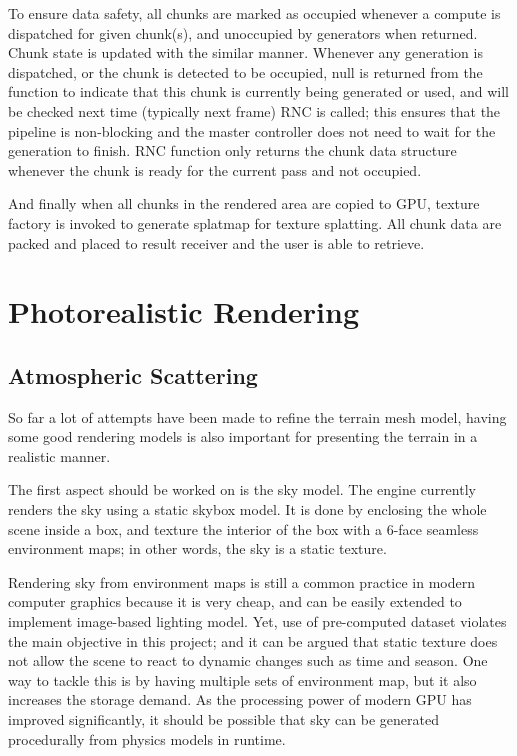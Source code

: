 \documentclass[oneside, a4paper]{report}
\begin{document}
    To ensure data safety, all chunks are marked as occupied whenever a compute is dispatched for given chunk(s), and unoccupied by generators when returned. Chunk state is updated with the similar manner. Whenever any generation is dispatched, or the chunk is detected to be occupied, null is returned from the function to indicate that this chunk is currently being generated or used, and will be checked next time (typically next frame) RNC is called; this ensures that the pipeline is non-blocking and the master controller does not need to wait for the generation to finish. RNC function only returns the chunk data structure whenever the chunk is ready for the current pass and not occupied.

    And finally when all chunks in the rendered area are copied to GPU, texture factory is invoked to generate splatmap for texture splatting. All chunk data are packed and placed to result receiver and the user is able to retrieve.

    \chapter{Photorealistic Rendering}

    \section{Atmospheric Scattering}

    So far a lot of attempts have been made to refine the terrain mesh model, having some good rendering models is also important for presenting the terrain in a realistic manner.

    The first aspect should be worked on is the sky model. The engine currently renders the sky using a static skybox model. It is done by enclosing the whole scene inside a box, and texture the interior of the box with a 6-face seamless environment maps; in other words, the sky is a static texture.

    Rendering sky from environment maps is still a common practice in modern computer graphics because it is very cheap, and can be easily extended to implement image-based lighting model. Yet, use of pre-computed dataset violates the main objective in this project; and it can be argued that static texture does not allow the scene to react to dynamic changes such as time and season. One way to tackle this is by having multiple sets of environment map, but it also increases the storage demand. As the processing power of modern GPU has improved significantly, it should be possible that sky can be generated procedurally from physics models in runtime.
\end{document}
